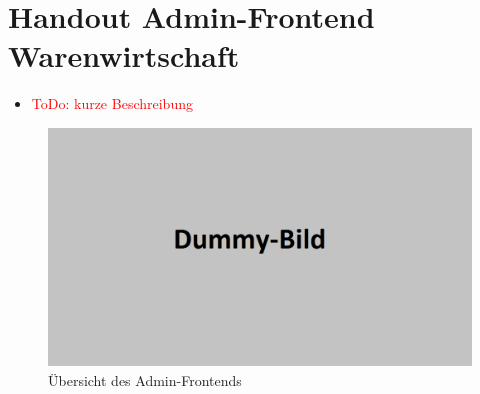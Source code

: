 







\section*{Handout Admin-Frontend Warenwirtschaft}


\begin{itemize}
	\item \textcolor{red}{ToDo: kurze Beschreibung}
\end{itemize}


\begin{figure}[H]
	\begin{center}
	\includegraphics[width=0.65 \textwidth]{./dummy.png}
	\end{center}
	\caption{Übersicht des Admin-Frontends}
\end{figure}



